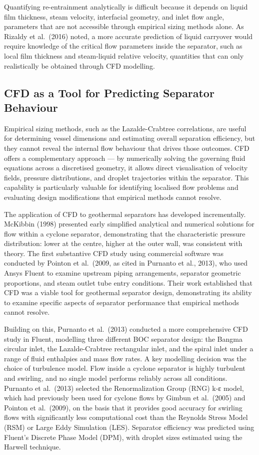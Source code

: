 Quantifying re-entrainment analytically is difficult because it depends on liquid film thickness, steam velocity, interfacial geometry, and inlet flow angle, parameters that are not accessible through empirical sizing methods alone. As Rizaldy et al.~(2016) noted, a more accurate prediction of liquid carryover would require knowledge of the critical flow parameters inside the separator, such as local film thickness and steam-liquid relative velocity, quantities that can only realistically be obtained through CFD modelling.

\subsection{CFD as a Tool for Predicting Separator Behaviour}

Empirical sizing methods, such as the Lazalde-Crabtree correlations, are useful for determining vessel dimensions and estimating overall separation efficiency, but they cannot reveal the internal flow behaviour that drives those outcomes. CFD offers a complementary approach --- by numerically solving the governing fluid equations across a discretised geometry, it allows direct visualisation of velocity fields, pressure distributions, and droplet trajectories within the separator. This capability is particularly valuable for identifying localised flow problems and evaluating design modifications that empirical methods cannot resolve.

The application of CFD to geothermal separators has developed incrementally. McKibbin (1998) presented early simplified analytical and numerical solutions for flow within a cyclone separator, demonstrating that the characteristic pressure distribution: lower at the centre, higher at the outer wall, was consistent with theory. The first substantive CFD study using commercial software was conducted by Pointon et al.~(2009, as cited in Purnanto et al., 2013), who used Ansys Fluent to examine upstream piping arrangements, separator geometric proportions, and steam outlet tube entry conditions. Their work established that CFD was a viable tool for geothermal separator design, demonstrating its ability to examine specific aspects of separator performance that empirical methods cannot resolve.

Building on this, Purnanto et al.~(2013) conducted a more comprehensive CFD study in Fluent, modelling three different BOC separator design: the Bangma circular inlet, the Lazalde-Crabtree rectangular inlet, and the spiral inlet under a range of fluid enthalpies and mass flow rates. A key modelling decision was the choice of turbulence model. Flow inside a cyclone separator is highly turbulent and swirling, and no single model performs reliably across all conditions. Purnanto et al.~(2013) selected the Renormalization Group (RNG) k-ε model, which had previously been used for cyclone flows by Gimbun et al.~(2005) and Pointon et al.~(2009), on the basis that it provides good accuracy for swirling flows with significantly less computational cost than the Reynolds Stress Model (RSM) or Large Eddy Simulation (LES). Separator efficiency was predicted using Fluent's Discrete Phase Model (DPM), with droplet sizes estimated using the Harwell technique.

